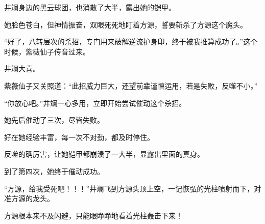 \begin{this_body}
井斓身边的黑云球团，也消散了大半，露出她的铠甲。

她脸色苍白，但神情振奋，双眼死死地盯着方源，誓要斩杀了方源这个魔头。

“好了，八转层次的杀招，专门用来破解逆流护身印，终于被我推算成功了。”这个时候，紫薇仙子传音过来。

井斓大喜。

紫薇仙子又关照道：“此招威力巨大，还望前辈谨慎运用，若是失败，反噬不小。”

“你放心吧。”井斓一心多用，立即开始尝试催动这个杀招。

她先后催动了三次，尽皆失败。

好在她经验丰富，每一次不对劲，都及时停住。

反噬的确厉害，让她铠甲都崩溃了一大半，显露出里面的真身。

到了第四次，她终于催动成功。

“方源，给我受死吧！！！”井斓飞到方源头顶上空，一记恢弘的光柱喷射而下，对准方源的龙头。

方源根本来不及闪避，只能眼睁睁地看着光柱轰击下来！

\end{this_body}

